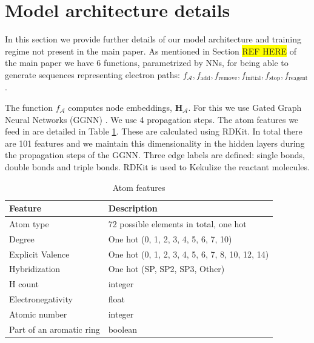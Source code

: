 \documentclass{article}
\newcommand{\highlight}[1]{\colorbox{yellow}{#1}}
\begin{document}
\section{Model architecture details}

\newcommand{\Ac}{{\mathcal{A}}}
\newcommand{\Hb}{{\mathbf{H}}}

\newcommand{\fEmbed}{f_{\Ac}}
\newcommand{\fAdd}{f_{\textrm{add}}}
\newcommand{\fRemove}{f_{\textrm{remove}}}
\newcommand{\fInitial}{f_{\textrm{initial}}}
\newcommand{\fStop}{f_{\textrm{stop}}}
\newcommand{\fReagEmbed}{f_{\textrm{reagent}}}
\newcommand{\fModules}{\fEmbed, \fAdd, \fRemove, \fInitial,\fStop, \fReagEmbed}

In this section we provide further details of our model architecture and training regime not present in the main paper. 
As mentioned in Section \highlight{REF HERE} of the main paper we have 6 functions, parametrized by NNs, for being able to generate sequences representing electron paths: $\fModules$. 

The function $\fEmbed$ computes node embeddings, $\Hb_{\Ac}$. For this we use Gated Graph Neural Networks (GGNN) \citep{li2016gated, gilmer2017neural}.
 We use 4 propagation steps. 
 The atom features we feed in are detailed in Table \ref{table:atom-features}. These are calculated using RDKit. In total there are 101 features and we maintain this dimensionality in the hidden layers during the propagation steps of the GGNN. Three edge labels are defined: single bonds, double bonds and triple bonds. RDKit is used to Kekulize the reactant molecules. 

\begin{table}
  \caption{Atom features}
  \label{table:atom-features}
  \centering
  \begin{tabular}{ll}
    \toprule
    Feature     & Description      \\
    \midrule
    Atom type & 72 possible elements in total, one hot  \\
    Degree     & One hot (0,   1,   2,   3,   4,   5,   6,   7,  10)  \\
    Explicit Valence     & One hot   (0,   1,   2,   3,   4,   5,   6,   7,   8,  10,  12,  14)    \\
    Hybridization & One hot (SP, SP2, SP3, Other) \\
    H count & integer \\
    Electronegativity & float \\
    Atomic number & integer \\
    Part of an aromatic ring & boolean\\
    \bottomrule
  \end{tabular}
\end{table}
\end{document}
